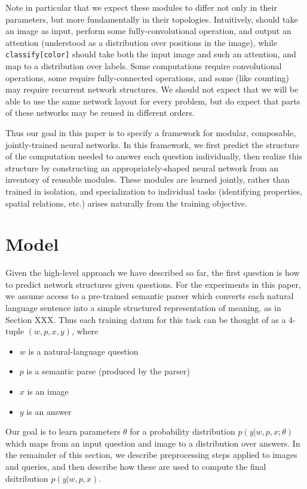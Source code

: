 \documentclass[10pt,twocolumn,letterpaper]{article}
\begin{document}
Note in particular that we expect these modules to differ not only in their
parameters, but more fundamentally in their topologies. Intuitively,
 should take an image as input, perform some
fully-convolutional operation, and output an attention (understood as a
distribution over positions in the image), while {\small\tt classify[color]}
should take both the input image and such an attention, and map to a
distribution over labels. Some computations require convolutional operations,
some require fully-connected operations, and some (like counting) may require
recurrent network structures. We should not expect that we will be able to use
the same network layout for every problem, but do expect that parts of these
networks may be reused in different orders.

Thus our goal in this paper is to specify a framework for modular, composable,
jointly-trained neural networks. In this framework, we first predict the
structure of the computation needed to answer each question individually, then
realize this structure by constructing an appropriately-shaped neural network
from an inventory of reusable modules. These modules are learned jointly, rather
than trained in isolation, and specialization to individual tasks (identifying
properties, spatial relations, etc.) arises naturally from the training
objective.



\section{Model}

Given the high-level approach we have described so far, the first question is how to
predict network structures given questions.
For the experiments in this paper, we assume access to a pre-trained semantic parser
which converts each natural language sentence into a simple structured
representation of meaning, as in Section XXX. Thus each training datum for this
task can be thought of as a 4-tuple $(w, p, x, y)$, where
\begin{itemize}
  \item $w$ is a natural-language question
  \item $p$ is a semantic parse (produced by the parser)
  \item $x$ is an image
  \item $y$ is an answer
\end{itemize}
Our goal is to learn parameters $\theta$ for a probability distribution $p(y |
w, p, x; \theta)$
which maps from an input question and image to a distribution over answers. In
the remainder of this section, we describe preprocessing steps applied to images
and queries, and then describe how these are used to compute the final
dsitribution $p(y | w, p, x)$.
\end{document}
